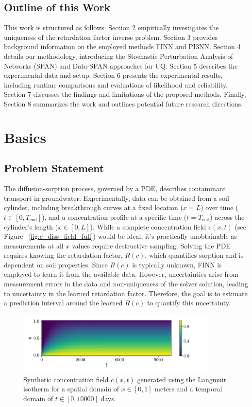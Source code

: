 \subsection{Outline of this Work}
This work is structured as follows: Section 2 empirically investigates the uniqueness of the retardation factor inverse problem. Section 3 provides background information on the employed methods FINN and PI3NN. Section 4 details our methodology, introducing the Stochastic Perturbation Analysis of Networks (SPAN) and Data-SPAN approaches for UQ. Section 5 describes the experimental data and setup. Section 6 presents the experimental results, including runtime comparisons and evaluations of likelihood and reliability. Section 7 discusses the findings and limitations of the proposed methods. Finally, Section 8 summarizes the work and outlines potential future research directions.



\section{Basics}

\subsection{Problem Statement}
The diffusion-sorption process, governed by a PDE, describes contaminant transport in groundwater. Experimentally, data can be obtained from a soil cylinder, including breakthrough curves at a fixed location ($x=L$) over time ($t \in [0, T_{\text{end}}]$), and a concentration profile at a specific time ($t=T_{\text{end}}$) across the cylinder's length ($x \in [0,L]$). While a complete concentration field $c(x,t)$ (see Figure ~\vref{fig:c_diss_field_full}) would be ideal, it's practically unobtainable as measurements at all $x$ values require destructive sampling. Solving the PDE requires knowing the retardation factor, $R(c)$, which quantifies sorption and is dependent on soil properties. Since $R(c)$ is typically unknown, FINN is employed to learn it from the available data. However, uncertainties arise from measurement errors in the data and non-uniqueness of the solver solution, leading to uncertainty in the learned retardation factor. Therefore, the goal is to estimate a prediction interval around the learned $R(c)$ to quantify this uncertainty.

\begin{figure}
    \centering
    \includegraphics[width=0.9\textwidth]{figs/c_diss_field_full.pdf}
    \caption{Synthetic concentration field $c(x,t)$ generated using the Langmuir isotherm for a spatial domain of $x \in [0, 1]$ meters and a temporal domain of $t \in [0, 10000]$ days.}
    \label{fig:c_diss_field_full}
\end{figure}


